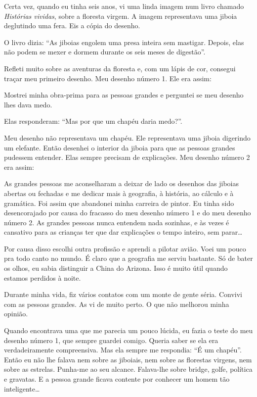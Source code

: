 \begin{Parallel}[p]{}{}
{Certa vez, quando eu tinha seis anos, vi uma linda imagem num livro
chamado \emph{Histórias vividas}, sobre a floresta virgem. A imagem
representava uma jiboia deglutindo uma fera. Eis a cópia do desenho.

O livro dizia: ``As jiboias engolem uma presa inteira sem mastigar.
Depois, elas não podem se mexer e dormem durante os seis meses de
digestão''.

Refleti muito sobre as aventuras da floresta e, com um lápis de cor,
consegui traçar meu primeiro desenho. Meu desenho número 1. Ele era
assim:

Mostrei minha obra-prima para as pessoas grandes e perguntei se meu
desenho lhes dava medo.

Elas responderam: ``Mas por que um chapéu daria medo?''.

Meu desenho não representava um chapéu. Ele representava uma jiboia
digerindo um elefante. Então desenhei o interior da jiboia para que as
pessoas grandes pudessem entender. Elas sempre precisam de explicações.
Meu desenho número 2 era assim:

As grandes pessoas me aconselharam a deixar de lado os desenhos das
jiboias abertas ou fechadas e me dedicar mais à geografia, à história,
ao cálculo e à gramática. Foi assim que abandonei minha carreira de
pintor. Eu tinha sido desencorajado por causa do fracasso do meu desenho
número 1 e do meu desenho número 2. As grandes pessoas nunca entendem
nada sozinhas, e às vezes é cansativo para as crianças ter que dar
explicações o tempo inteiro, sem parar\ldots{}

Por causa disso escolhi outra profissão e aprendi a pilotar avião. Voei
um pouco pra todo canto no mundo. É claro que a geografia me serviu
bastante. Só de bater os olhos, eu sabia distinguir a China do Arizona.
Isso é muito útil quando estamos perdidos à noite.

Durante minha vida, fiz vários contatos com um monte de gente séria.
Convivi com as pessoas grandes. As vi de muito perto. O que não melhorou
minha opinião.

Quando encontrava uma que me parecia um pouco lúcida, eu fazia o teste
do meu desenho número 1, que sempre guardei comigo. Queria saber se ela
era verdadeiramente compreensiva. Mas ela sempre me respondia: ``É um
chapéu''. Então eu não lhe falava nem sobre as jiboiais, nem sobre as
florestas virgens, nem sobre as estrelas. Punha-me ao seu alcance.
Falava-lhe sobre bridge, golfe, política e gravatas. E a pessoa grande
ficava contente por conhecer um homem tão inteligente\ldots{}\\

}
\end{Parallel}
